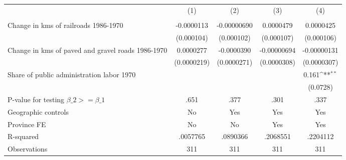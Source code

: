 {
\def\sym#1{\ifmmode^{#1}\else\(^{#1}\)\fi}
\begin{tabular}{l*{4}{c}}
\hline\hline
                &\multicolumn{1}{c}{(1)}&\multicolumn{1}{c}{(2)}&\multicolumn{1}{c}{(3)}&\multicolumn{1}{c}{(4)}\\
                &\multicolumn{1}{c}{}&\multicolumn{1}{c}{}&\multicolumn{1}{c}{}&\multicolumn{1}{c}{}\\
\hline
Change in kms of railroads 1986-1970&-0.0000113         &-0.00000690         &0.0000479         &0.0000425         \\
                &(0.000104)         &(0.000102)         &(0.000107)         &(0.000106)         \\
[1em]
Change in kms of paved and gravel roads 1986-1970&0.0000277         &-0.0000390         &-0.00000694         &-0.00000131         \\
                &(0.0000219)         &(0.0000271)         &(0.0000308)         &(0.0000307)         \\
[1em]
Share of public administration labor 1970&                  &                  &                  &    0.161\sym{**} \\
                &                  &                  &                  & (0.0728)         \\
\hline
P-value for testing $\beta\_{2} >= \beta\_{1}$&     .651         &     .377         &     .301         &     .337         \\
Geographic controls&       No         &      Yes         &      Yes         &      Yes         \\
Province FE     &       No         &       No         &      Yes         &      Yes         \\
R-squared       & .0057765         & .0890366         & .2068551         & .2204112         \\
Observations    &      311         &      311         &      311         &      311         \\
\hline\hline
\end{tabular}
}

